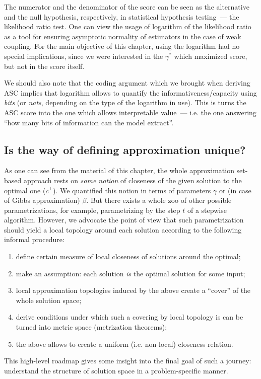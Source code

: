 The numerator and the denominator of the score can be seen as the
alternative and the null hypothesis, respectively, in statistical hypothesis
testing~--- the likelihood ratio test. One can view the usage of logarithm of
the likelihood ratio as a tool for ensuring asymptotic normality of estimators
in the case of weak coupling. For the main objective of this chapter, using the
logarithm had no special implications, since we were interested in the $\gamma^*$
which maximized score, but not in the score itself.

We should also note that the coding argument which we brought when deriving ASC
implies that logarithm allows to quantify the informativeness/capacity using \textit{bits}
(or \textit{nats}, depending on the type of the logarithm in use). This is 
turns the ASC score into the one which allows interpretable value~--- i.e. the one
answering ``how many bits of information can the model extract''.

\subsection*{Is the way of defining approximation unique?}
As one can see from the material of this chapter, the whole approximation
set-based approach rests on \textit{some notion} of closeness of the given
solution to the optimal one ($c^\bot$). We quantified this notion in terms of
parameters $\gamma$ or (in case of Gibbs approximation) $\beta$. But there
exists a whole zoo of other possible parametrizations, for example,
parametrizing by the step $t$ of a stepwise algorithm. However, we advocate the
point of view that such parametrization should yield a local topology around
each solution according to the following informal procedure:

\begin{enumerate}
  \item define certain measure of local closeness of solutions around the optimal;

  \item make an assumption: each solution \textit{is} the optimal solution for some
  input;

  \item local approximation topologies induced by the above create a ``cover''
  of the whole solution space; 

  \item derive conditions under which such a covering by local topology is can be
  turned into metric space (metrization theorems); 

  \item the above allows to create a uniform (i.e. non-local) closeness relation.
\end{enumerate}
This high-level roadmap gives some insight into the final goal of such a journey:
understand the structure of solution space in a problem-specific manner.

